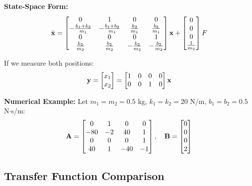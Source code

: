 \textbf{State-Space Form:}
\begin{equation}
    \dot{\mathbf{x}} = \begin{bmatrix}
        0 & 1 & 0 & 0 \\
        -\frac{k_1+k_2}{m_1} & -\frac{b_1+b_2}{m_1} & \frac{k_2}{m_1} & \frac{b_2}{m_1} \\
        0 & 0 & 0 & 1 \\
        \frac{k_2}{m_2} & \frac{b_2}{m_2} & -\frac{k_2}{m_2} & -\frac{b_2}{m_2}
    \end{bmatrix} \mathbf{x} +
    \begin{bmatrix} 0 \\ 0 \\ 0 \\ \frac{1}{m_2} \end{bmatrix} F
    \label{eq:two_mass_state_space}
\end{equation}

If we measure both positions:
\begin{equation}
    \mathbf{y} = \begin{bmatrix} x_1 \\ x_2 \end{bmatrix} =
    \begin{bmatrix} 1 & 0 & 0 & 0 \\ 0 & 0 & 1 & 0 \end{bmatrix} \mathbf{x}
\end{equation}

\textbf{Numerical Example:} Let $m_1 = m_2 = 0.5$ kg, $k_1 = k_2 = 20$ N/m, $b_1 = b_2 = 0.5$ N$\cdot$s/m:
\begin{equation}
    \mathbf{A} = \begin{bmatrix}
        0 & 1 & 0 & 0 \\
        -80 & -2 & 40 & 1 \\
        0 & 0 & 0 & 1 \\
        40 & 1 & -40 & -1
    \end{bmatrix}, \quad
    \mathbf{B} = \begin{bmatrix} 0 \\ 0 \\ 0 \\ 2 \end{bmatrix}
\end{equation}

\subsection{Transfer Function Comparison}

